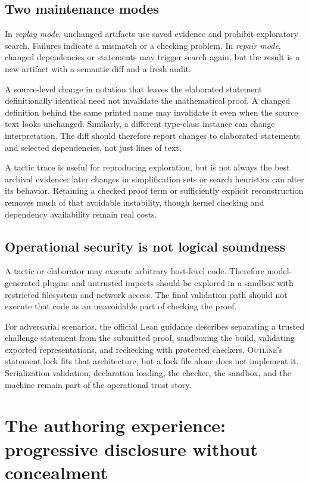 \documentclass[11pt,a4paper]{article}
\newcommand{\Outline}{\textsc{Outline}}
\theoremstyle{definition}
\theoremstyle{remark}
\numberwithin{equation}{section}
\begin{document}
\subsection{Two maintenance modes}
In \emph{replay mode}, unchanged artifacts use saved evidence and prohibit exploratory search. Failures indicate a mismatch or a checking problem. In \emph{repair mode}, changed dependencies or statements may trigger search again, but the result is a new artifact with a semantic diff and a fresh audit.

A source-level change in notation that leaves the elaborated statement definitionally identical need not invalidate the mathematical proof. A changed definition behind the same printed name may invalidate it even when the source text looks unchanged. Similarly, a different type-class instance can change interpretation. The diff should therefore report changes to elaborated statements and selected dependencies, not just lines of text.

A tactic trace is useful for reproducing exploration, but is not always the best archival evidence: later changes in simplification sets or search heuristics can alter its behavior. Retaining a checked proof term or sufficiently explicit reconstruction removes much of that avoidable instability, though kernel checking and dependency availability remain real costs.

\subsection{Operational security is not logical soundness}
A tactic or elaborator may execute arbitrary host-level code. Therefore model-generated plugins and untrusted imports should be explored in a sandbox with restricted filesystem and network access. The final validation path should not execute that code as an unavoidable part of checking the proof.

For adversarial scenarios, the official Lean guidance describes separating a trusted challenge statement from the submitted proof, sandboxing the build, validating exported representations, and rechecking with protected checkers.\cite{lean-validation} \Outline's statement lock fits that architecture, but a lock file alone does not implement it. Serialization validation, declaration loading, the checker, the sandbox, and the machine remain part of the operational trust story.

\section{The authoring experience: progressive disclosure without concealment}
\label{sec:ux}
\end{document}
